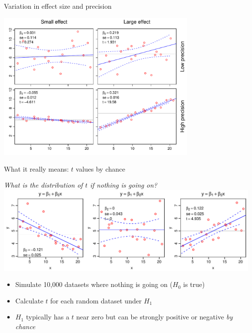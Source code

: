 \documentclass[xcolor=x11names,compress]{beamer}
\renewcommand{\(}{\begin{columns}}
\renewcommand{\)}{\end{columns}}
\newcommand{\<}[1]{\begin{column}{#1}}
\renewcommand{\>}{\end{column}}
\begin{document}
\begin{frame}{Variation in effect size and precision}
	
\centerline{\includegraphics[height=75mm]{T_examples.pdf}}

\end{frame}

\begin{frame}{What it really means: $t$ values by chance}

\begin{center}
    \it What is the distribution of $t$ if nothing is going on?\\
    \pause
    \includegraphics[width=\textwidth]{t_extremes.pdf}
\end{center}

\pause
\begin{itemize}[<+->]\itemsep6pt
\item Simulate 10,000 datasets where nothing is going on ($H_0$ is true)
\item Calculate $t$ for each random dataset under $H_1$
\item $H_1$ typically has a $t$ near zero but can be strongly positive or negative {\it by chance}
\end{itemize}

\end{frame}
\end{document}
